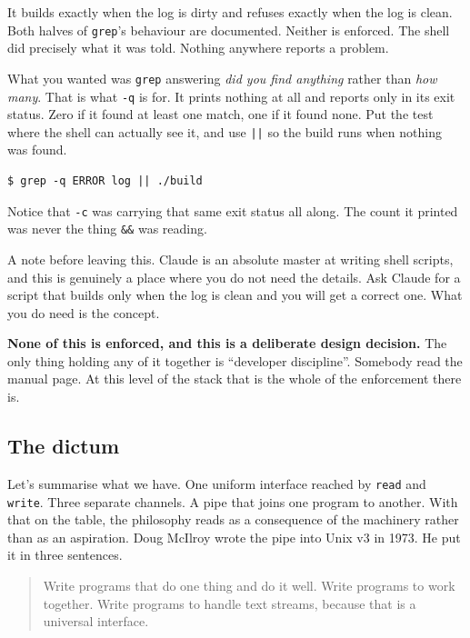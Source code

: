\documentclass[11pt,a4paper]{article}
\begin{document}
It builds exactly when the log is dirty and refuses exactly when the log is clean. Both halves of
\texttt{grep}'s behaviour are documented. Neither is enforced. The shell did precisely what it was
told. Nothing anywhere reports a problem.

What you wanted was \texttt{grep} answering \emph{did you find anything} rather than \emph{how
many}. That is what \texttt{-q} is for. It prints nothing at all and reports only in its exit
status. Zero if it found at least one match, one if it found none. Put the test where the shell can
actually see it, and use \texttt{||} so the build runs when nothing was found.

\begin{lstlisting}[language=SH]
$ grep -q ERROR log || ./build
\end{lstlisting}

Notice that \texttt{-c} was carrying that same exit status all along. The count it printed was
never the thing \texttt{\&\&} was reading.

A note before leaving this. Claude is an absolute master at writing shell scripts, and this is
genuinely a place where you do not need the details. Ask Claude for a script that builds only when
the log is clean and you will get a correct one. What you do need is the concept.

\textbf{None of this is enforced, and this is a deliberate design decision.} The only thing holding
any of it together is ``developer discipline''. Somebody read the manual page. At this level of the
stack that is the whole of the enforcement there is.

\subsection{The dictum}

Let's summarise what we have. One uniform interface reached by \texttt{read} and \texttt{write}.
Three separate channels. A pipe that joins one program to another. With that on the table, the
philosophy reads as a consequence of the machinery rather than as an aspiration. Doug McIlroy wrote
the pipe into Unix v3 in 1973. He put it in three sentences.

\begin{quote}
Write programs that do one thing and do it well. Write programs to work together. Write
programs to handle text streams, because that is a universal interface.
\end{quote}
\end{document}
